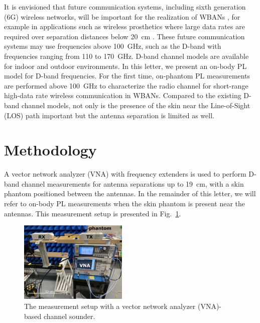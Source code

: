 \documentclass[preprint]{rsl}
\begin{document}
It is envisioned that future communication systems, including sixth generation (6G) wireless networks, will be important for the realization of WBANs \cite{Cornet2022}, for example in applications such as wireless prosthetics where large data rates are required over separation distances below 20~cm \cite{Proesmans2022}.
These future communication systems may use frequencies above 100~GHz, such as the D-band with frequencies ranging from 110 to 170~GHz.
D-band channel models are available for indoor \cite{DeBeelde2021_access, Pometcu2020} and outdoor \cite{DeBeelde2022_tap,DeBeelde2022_wcl} environments. 
In this letter, we present an on-body PL model for D-band frequencies. 
For the first time, on-phantom PL measurements are performed above 100~GHz to characterize the radio channel for short-range high-data rate wireless communication in WBANs.
Compared to the existing D-band channel models, not only is the presence of the skin near the Line-of-Sight (LOS) path important but the antenna separation is limited as well. 


\section{Methodology \label{sect:method}}

A vector network analyzer (VNA) with frequency extenders is used to perform D-band channel measurements for antenna separations up to 19~cm, with a skin phantom positioned between the antennas.
In the remainder of this letter, we will refer to on-body PL measurements when the skin phantom is present near the antennas. 
This measurement setup is presented in Fig.~\ref{fig:sounder_setup}.
\begin{figure}[tb]
\begin{center}
	\includegraphics[width=0.46\textwidth]{figures/measurement_setup}
\caption{The measurement setup with a vector network analyzer (VNA)-based channel sounder.}
\label{fig:sounder_setup}
\end{center}
\end{figure}
\end{document}
